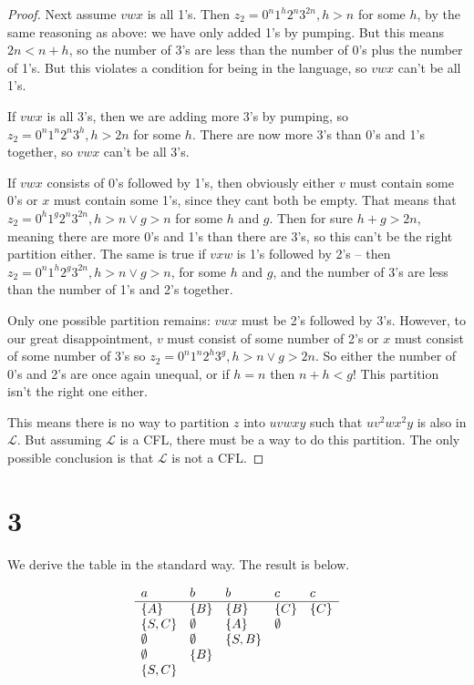 \documentclass{article}
\begin{document}
\begin{proof}
Next assume $vwx$ is all 1's. Then $z_2 = 0^n1^h2^n3^{2n}, h>n$ for some $h$, by the same reasoning as above: we have only added 1's by pumping. But this means $2n < n+h$, so the number of 3's are less than the number of 0's plus the number of 1's. But this violates a condition for being in the language, so $vwx$ can't be all 1's.

If $vwx$ is all 3's, then we are adding more 3's by pumping, so $z_2 = 0^n1^n2^n3^h, h > 2n$ for some $h$. There are now more 3's than 0's and 1's together, so $vwx$ can't be all 3's.

If $vwx$ consists of 0's followed by 1's, then obviously either $v$ must contain some 0's or $x$ must contain some 1's, since they cant both be empty. That means that $z_2 = 0^h1^g2^n3^{2n}, h > n \lor g > n$ for some $h$ and $g$. Then for sure $h + g > 2n$, meaning there are more 0's and 1's than there are 3's, so this can't be the right partition either. The same is true if $vxw$ is 1's followed by 2's – then $z_2 = 0^n1^h2^g3^{2n}, h > n \lor g > n$, for some $h$ and $g$, and the number of 3's are less than the number of 1's and 2's together.

Only one possible partition remains: $vwx$ must be 2's followed by 3's. However, to our great disappointment, $v$ must consist of some number of 2's or $x$ must consist of some number of 3's so $z_2 = 0^n1^n2^h3^g, h > n \lor g > 2n$. So either the number of 0's and 2's are once again unequal, or if $h=n$ then $n + h < g$! This partition isn't the right one either.

This means there is no way to partition $z$ into $uvwxy$ such that $uv^2wx^2y$ is also in $\mathcal{L}$. But assuming $\mathcal{L}$ is a CFL, there must be a way to do this partition. The only possible conclusion is that $\mathcal{L}$ is not a CFL.

\end{proof}

\newpage
\section*{3}

We derive the table in the standard way. The result is below.

\begin{align*}
    &\begin{array}{l l l l l}
        a & b & b& c & c \\ \hline
        \set{A} & \set{B} & \set{B} &\set{C} &\set{C} \\
        \set{S,C} &\emptyset &\set{A} &\emptyset &\\
        \emptyset & \emptyset & \set{S,B} &&\\
        \emptyset & \set{B} &&&\\
        \set{S,C} &&&&
    \end{array}
    \\
\end{align*}
\end{document}

